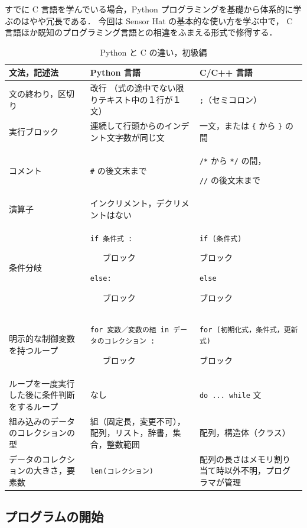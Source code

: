 \documentclass[11pt,a4,epsf]{report}
\begin{document}
すでに C 言語を学んでいる場合，Python プログラミングを基礎から体系的に学ぶのはやや冗長である．
今回は Sensor Hat の基本的な使い方を学ぶ中で， C 言語ほか既知のプログラミング言語との相違をふまえる形式で修得する．

\begin{table}[h]
\caption{Python と C の違い，初級編}
  \begin{tabular}{|p{1.5in}|p{2in}|p{2in}|}
\hline
文法，記述法 & Python 言語 & C/C++ 言語 \\
\hline
\hline
文の終わり，区切り & 改行 （式の途中でない限りテキスト中の１行が１文） & \verb+;+（セミコロン） \\
\hline
実行ブロック & 連続して行頭からのインデント文字数が同じ文 & 一文，または \verb+{+ から \verb+}+ の間\\
\hline
コメント & \verb+#+ の後文末まで & \verb+/*+ から \verb+*/+ の間，\par \verb+//+ の後文末まで \\
\hline
演算子 & インクリメント，デクリメントはない &  \\
\hline
条件分岐 & \verb+if 条件式 :+\par ~~~ブロック \par\verb+else:+ \par ~~~ブロック & \verb+if (条件式) +\par ブロック\par\verb+else+\par ブロック \\
\hline
明示的な制御変数を持つループ & \verb+for 変数／変数の組 in データのコレクション :+ \par ~~~ブロック& \verb+for (初期化式，条件式，更新式)+ \par ブロック \\
\hline
ループを一度実行した後に条件判断をするループ & なし & \verb+do ... while+ 文\\
\hline
組み込みのデータのコレクションの型 & 組（固定長，変更不可），配列，リスト，辞書，集合，整数範囲 & 配列，構造体（クラス）\\
\hline
データのコレクションの大きさ，要素数 & \verb+len(コレクション)+ & 配列の長さはメモリ割り当て時以外不明，プログラマが管理\\
\hline
  \end{tabular}
\end{table}

\subsection{プログラムの開始}
\end{document}
